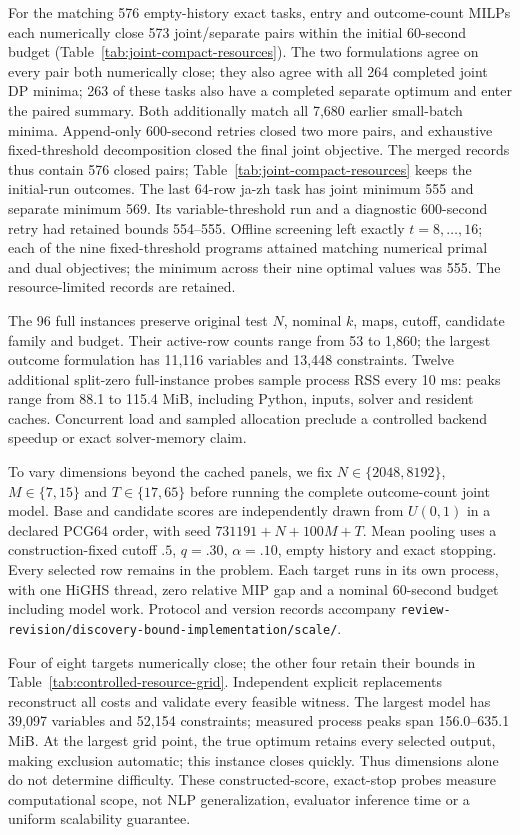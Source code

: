 For the matching 576 empty-history exact tasks, entry and outcome-count MILPs each numerically close 573 joint/separate pairs within the initial 60-second budget (Table~\ref{tab:joint-compact-resources}). The two formulations agree on every pair both numerically close; they also agree with all 264 completed joint DP minima; 263 of these tasks also have a completed separate optimum and enter the paired summary. Both additionally match all 7,680 earlier small-batch minima. Append-only 600-second retries closed two more pairs, and exhaustive fixed-threshold decomposition closed the final joint objective. The merged records thus contain 576 closed pairs; Table~\ref{tab:joint-compact-resources} keeps the initial-run outcomes. The last 64-row ja-zh task has joint minimum 555 and separate minimum 569. Its variable-threshold run and a diagnostic 600-second retry had retained bounds 554--555. Offline screening left exactly $t=8,\ldots,16$; each of the nine fixed-threshold programs attained matching numerical primal and dual objectives; the minimum across their nine optimal values was 555. The resource-limited records are retained.


The 96 full instances preserve original test $N$, nominal $k$, maps, cutoff, candidate family and budget. Their active-row counts range from 53 to 1,860; the largest outcome formulation has 11,116 variables and 13,448 constraints. Twelve additional split-zero full-instance probes sample process RSS every 10 ms: peaks range from 88.1 to 115.4 MiB, including Python, inputs, solver and resident caches. Concurrent load and sampled allocation preclude a controlled backend speedup or exact solver-memory claim.

To vary dimensions beyond the cached panels, we fix $N\in\{2048,8192\}$, $M\in\{7,15\}$ and $T\in\{17,65\}$ before running the complete outcome-count joint model. Base and candidate scores are independently drawn from $U(0,1)$ in a declared PCG64 order, with seed $731191+N+100M+T$. Mean pooling uses a construction-fixed cutoff $.5$, $q=.30$, $\alpha=.10$, empty history and exact stopping. Every selected row remains in the problem. Each target runs in its own process, with one HiGHS thread, zero relative MIP gap and a nominal 60-second budget including model work. Protocol and version records accompany \nolinkurl{review-revision/discovery-bound-implementation/scale/}.

Four of eight targets numerically close; the other four retain their bounds in Table~\ref{tab:controlled-resource-grid}. Independent explicit replacements reconstruct all costs and validate every feasible witness. The largest model has 39,097 variables and 52,154 constraints; measured process peaks span 156.0--635.1 MiB. At the largest grid point, the true optimum retains every selected output, making exclusion automatic; this instance closes quickly. Thus dimensions alone do not determine difficulty. These constructed-score, exact-stop probes measure computational scope, not NLP generalization, evaluator inference time or a uniform scalability guarantee.

